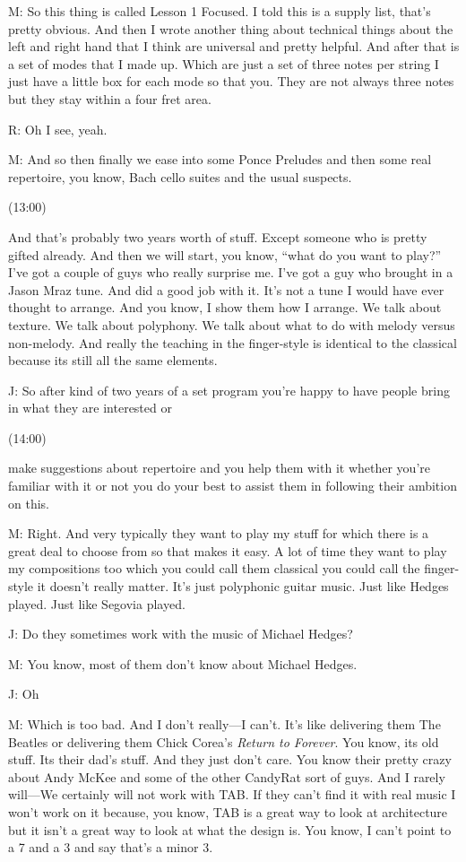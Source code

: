 \documentclass[11pt]{article}
\begin{document}
M: So this thing is called Lesson 1 Focused. I told this is a supply list, that's pretty obvious. And then I wrote another thing about technical things about the left and right hand that I think are universal and pretty helpful. And after that is a set of modes that I made up. Which are just a set of three notes per string I just have a little box for each mode so that you. They are not always three notes but they stay within a four fret area. 

R: Oh I see, yeah. 

M: And so then finally we ease into some Ponce Preludes and then some real repertoire, you know, Bach cello suites and the usual suspects. 

(13:00)

And that's probably two years worth of stuff. Except someone who is pretty gifted already. And then we will start, you know, ``what do you want to play?'' I've got a couple of guys who really surprise me. I've got a guy who brought in a Jason Mraz tune. And did a good job with it. It's not a tune I would  have ever thought to arrange. And you know, I show them how I arrange. We talk about texture. We talk about polyphony. We talk about what to do with melody versus non-melody. And really the teaching in the finger-style is identical to the classical because its still all the same elements.

J: So after kind of two years of a set program you're happy to have people bring in what they are interested or 

(14:00)

make suggestions about repertoire and you help them with it whether you're familiar with it or not you do your best to assist them in following their ambition on this.

M: Right. And very typically they want to play my stuff for which there is a great deal to choose from so that makes it easy. A lot of time they want to play my compositions too which you could call them classical you could call the finger-style it doesn't really matter. It's just polyphonic guitar music. Just like Hedges played. Just like Segovia played. 

J: Do they sometimes work with the music of Michael Hedges?

M: You know, most of them don't know about Michael Hedges.

J: Oh

M: Which is too bad. And I don't really---I can't. It's like delivering them The Beatles or delivering them Chick Corea's \emph{Return to Forever}. You know, its old stuff. Its their dad's stuff. And they just don't care. You know their pretty crazy about Andy McKee and some of the other CandyRat sort of guys. And I rarely will---We certainly will not work with TAB. If they can't find it with real music I won't work on it because, you know, TAB is a great way to look at architecture but it isn't a great way to look at what the design is. You know, I can't point to a 7 and a 3 and say that's a minor 3. 
\end{document}
